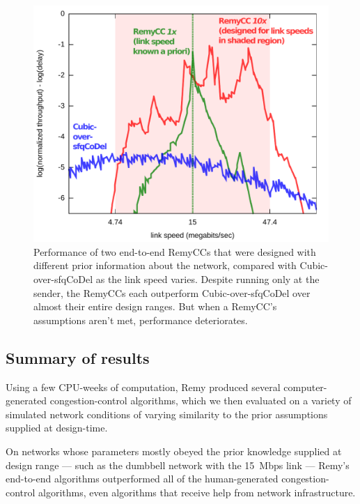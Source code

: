 \begin{figure}
\includegraphics[width=\columnwidth]{spec2.pdf}
\caption{Performance of two end-to-end RemyCCs that were designed with
  different prior information about the network, compared with
  Cubic-over-sfqCoDel as the link speed varies. Despite running only
  at the sender, the RemyCCs each outperform Cubic-over-sfqCoDel over
  almost their entire design ranges. But when a RemyCC's
  assumptions aren't met, performance deteriorates.}

\label{f:spec}

\end{figure}

\subsection{Summary of results}

Using a few CPU-weeks of computation,
Remy produced several computer-generated congestion-control algorithms,
which we then evaluated on a variety of simulated network conditions
of varying similarity to the prior assumptions supplied at design-time.

On networks whose parameters mostly obeyed the prior knowledge
supplied at design range --- such as the dumbbell network with the
15~Mbps link --- Remy's end-to-end algorithms outperformed all of the
human-generated congestion-control algorithms, even algorithms that
receive help from network infrastructure.

